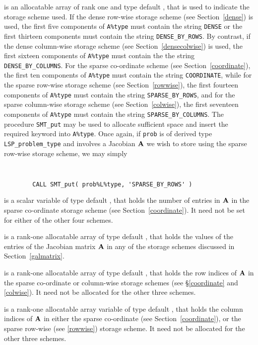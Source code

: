 \documentclass{galahad}
\newcommand{\packagename}{LSP}
\begin{document}
\begin{description}
\begin{description}
 is an allocatable array of rank one and type default \character,
that is used to indicate the storage scheme used. If the dense row-wise
storage scheme (see Section~\ref{dense}) is used,
the first five components of {\tt A\%type} must contain the
string {\tt DENSE} or the first thirteen components must contain the
string {\tt DENSE\_BY\_ROWS}.
By contrast, if the dense column-wise storage scheme
(see Section~\ref{densecolwise}) is used,
the first sixteen components of {\tt A\%type} must contain the
the string {\tt DENSE\_BY\_COLUMNS}.
For the sparse co-ordinate scheme (see Section~\ref{coordinate}),
the first ten components of {\tt A\%type} must contain the
string {\tt COORDINATE}, while
for the sparse row-wise storage scheme (see Section~\ref{rowwise}),
the first fourteen components of {\tt A\%type} must contain the
string {\tt SPARSE\_BY\_ROWS},
and for the sparse column-wise storage scheme (see Section~\ref{colwise}),
the first seventeen components of {\tt A\%type} must contain the
string {\tt SPARSE\_BY\_COLUMNS}.
The procedure {\tt SMT\_put} may be used to allocate sufficient space and
insert the required keyword into {\tt A\%type}.
Once again, if {\tt prob} is of derived type {\tt \packagename\_problem\_type}
and involves a Jacobian ${\mathbf{A}}$ we wish to store using the sparse row-wise
storage scheme, we may simply
{\tt
\begin{verbatim}
        CALL SMT_put( prob%L%type, 'SPARSE_BY_ROWS' )
\end{verbatim}
}
\noindent

 is a scalar variable of type default \integer, that
holds the number of entries in ${\mathbf{A}}$
in the sparse co-ordinate storage scheme (see Section~\ref{coordinate}).
It need not be set for either of the other four schemes.

 is a rank-one allocatable array of type default \realdp, that holds
the values of the entries of the Jacobian matrix ${\mathbf{A}}$ in any of the
storage schemes discussed in Section~\ref{galmatrix}.

 is a rank-one allocatable array of type default \integer,
that holds the row indices of ${\mathbf{A}}$ in the sparse co-ordinate
or column-wise storage schemes (see \S\ref{coordinate} and \ref{colwise}).
It need not be allocated for the other three schemes.

 is a rank-one allocatable array variable of type default \integer,
that holds the column indices of ${\mathbf{A}}$ in either the sparse co-ordinate
(see Section~\ref{coordinate}), or the sparse row-wise
(see \ref{rowwise}) storage scheme.
It need not be allocated for the other three schemes.


\end{description}
\end{description}
\end{document}

